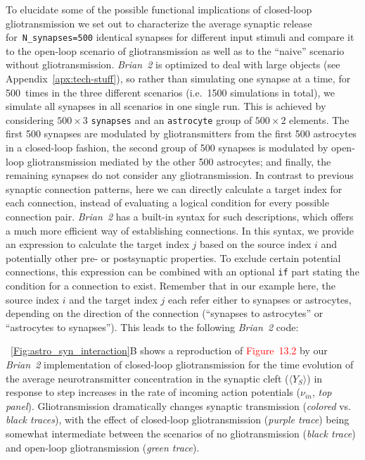 \documentclass[a4paper, 11pt]{article}
\newcommand{\brian}{\emph{Brian~2}\xspace}
\newcommand{\tave}[1]{\ensuremath{\langle#1\rangle}}
\newcommand*{\figref}[1]{\figurename~\ref{#1}}
\newcommand*{\appref}[1]{Appendix~\ref{#1}}
\begin{document}
To elucidate some of the possible functional implications of closed-loop gliotransmission we set out to characterize the average synaptic release for~\lstinline|N_synapses=500| identical synapses for different input stimuli and compare it to the open-loop scenario of gliotransmission as well as to the ``naive'' scenario without gliotransmission.
\brian is optimized to deal with large objects (see \appref{apx:tech-stuff}), so rather than simulating one synapse at a time, for 500~times in the three different scenarios (i.e.~1500 simulations in total), we simulate all synapses in all scenarios in one single run.
This is achieved by considering $500\times 3$ \lstinline|synapses| and an \lstinline|astrocyte| group of $500\times 2$ elements. The first 500 synapses are modulated by gliotransmitters from the first 500 astrocytes in a closed-loop fashion, the second group of 500 synapses is modulated by open-loop gliotransmission mediated by the other 500 astrocytes; and finally, the remaining synapses do not consider any gliotransmission.
In contrast to previous synaptic connection patterns, here we can directly calculate a target index for each connection, instead of evaluating a logical condition for every possible connection pair.
\brian has a built-in syntax for such descriptions, which offers a much more efficient way of establishing connections.
In this syntax, we provide an expression to calculate the target index $j$ based on the source index $i$ and potentially other pre- or postsynaptic properties.
To exclude certain potential connections, this expression can be combined with an optional \lstinline|if| part stating the condition for a connection to exist.
Remember that in our example here, the source index $i$ and the target index $j$ each refer either to synapses or astrocytes, depending on the direction of the connection (``synapses to astrocytes'' or ``astrocytes to synapses'').
This leads to the following \brian code:


\figref{Fig:astro_syn_interaction}B shows a reproduction of \textcolor{red}{Figure~13.2} by our \brian implementation of closed-loop gliotransmission for the time evolution of the average neurotransmitter concentration in the synaptic cleft ($\tave{Y_S}$) in response to step increases in the rate of incoming action potentials ($\nu_{in}$, \textit{top panel}).
Gliotransmission dramatically changes synaptic transmission (\textit{colored} vs. \textit{black traces}), with the effect of closed-loop gliotransmission (\textit{purple trace}) being somewhat intermediate between the scenarios of no gliotransmission (\textit{black trace}) and open-loop gliotransmission (\textit{green trace}).
\end{document}
